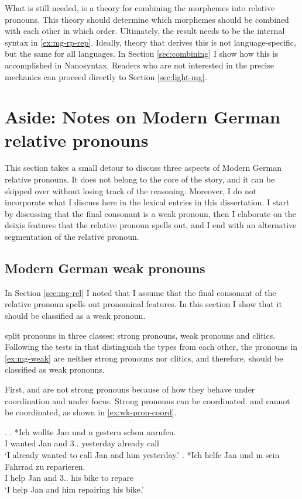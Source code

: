 What is still needed, is a theory for combining the morphemes into relative pronouns. This theory should determine which morphemes should be combined with each other in which order. Ultimately, the result needs to be the internal syntax in \ref{ex:mg-rp-rep}.
Ideally, theory that derives this is not language-specific, but the same for all languages. In Section \ref{sec:combining} I show how this is accomplished in Nanosyntax. Readers who are not interested in the precise mechanics can proceed directly to Section \ref{sec:light-mg}.


\section{Aside: Notes on Modern German relative pronouns}\label{sec:aside-mg-rp}

This section takes a small detour to discuss three aspects of Modern German relative pronouns. It does not belong to the core of the story, and it can be skipped over without losing track of the reasoning. Moreover, I do not incorporate what I discuss here in the lexical entries in this dissertation. I start by discussing that the final consonant is a weak pronoun, then I elaborate on the deixis features that the relative pronoun spells out, and I end with an alternative segmentation of the relative pronoun.

\subsection{Modern German weak pronouns}\label{sec:mg-weak-pronoun}

In Section \ref{sec:mg-rel} I noted that I assume that the final consonant of the relative pronoun spells out pronominal features. In this section I show that it should be classified as a weak pronoun.

\citet{cardinaletti1994} split pronouns in three classes: strong pronouns, weak pronouns and clitics. Following the tests in \citet{cardinaletti1994} that distinguish the types from each other, the pronouns in \ref{ex:mg-weak} are neither strong pronouns nor clitics, and therefore, should be classified as weak pronouns.

First,  and  are not strong pronouns because of how they behave under coordination and under focus.
Strong pronouns can be coordinated.  and  cannot be coordinated, as shown in \ref{ex:wk-pron-coord}.

\ex.\label{ex:wk-pron-coord}
\ag. *Ich wollte Jan und n gestern schon anrufen.\\
 I wanted Jan and 3.. yesterday already call\\
 `I already wanted to call Jan and him yesterday.'
\bg. *Ich helfe Jan und m sein Fahrrad zu reparieren.\\
 I help Jan and 3.. his bike to repare\\
 `I help Jan and him repairing his bike.'

